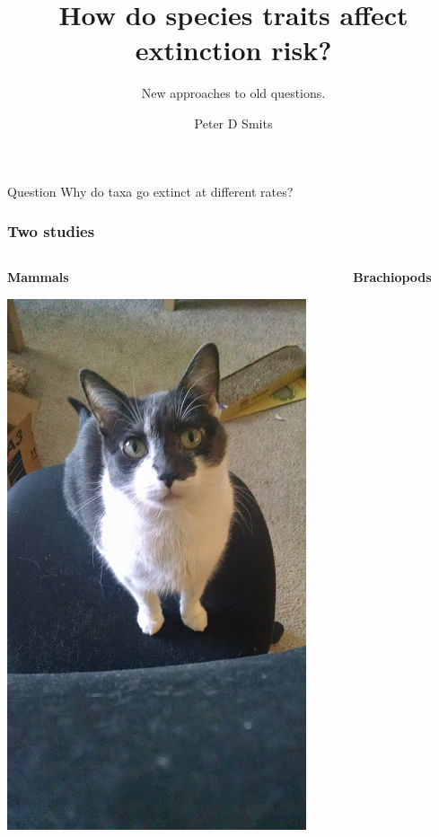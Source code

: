 \documentclass{beamer}
\title{How do species traits affect extinction risk?}
\subtitle{New approaches to old questions.}
\author{Peter D Smits}
\institute{Committee on Evolutionary Biology}
\date{}
\begin{document}
\begin{frame}
  \titlepage
\end{frame}

\begin{frame}
  \begin{alertblock}{Question}
    Why do taxa go extinct at different rates?
  \end{alertblock}
\end{frame}

\begin{frame}
  \frametitle{Two studies}

  \begin{columns}
    \begin{column}{0.5\textwidth}
      \begin{center}
        \textbf{Mammals}

        \vspace{0.5cm}

        \includegraphics[height = 0.555\textheight, keepaspectratio = true]{figure/annyong_2}
      \end{center}
    \end{column}
    \begin{column}{0.5\textwidth}
      \begin{center}
        \textbf{Brachiopods}
        

\end{center}
\end{column}
\end{columns}
\end{frame}
\end{document}

